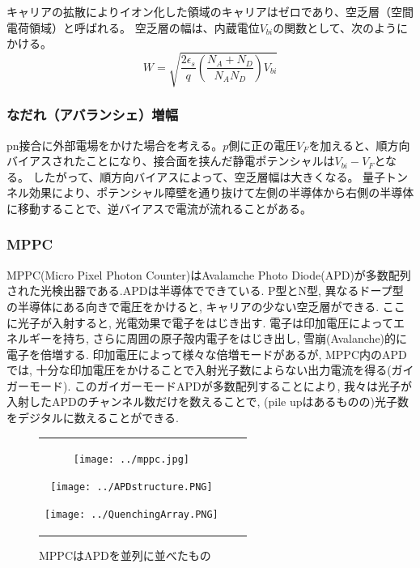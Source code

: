 キャリアの拡散によりイオン化した領域のキャリアはゼロであり、空乏層（空間電荷領域）と呼ばれる。
空乏層の幅は、内蔵電位$V_{bi}$の関数として、次のようにかける。
\begin{equation}
W=\sqrt{\frac{2\epsilon_s}{q}\left(\frac{N_A+N_D}{N_AN_D}\right)V_{bi}}
\end{equation}

\subsubsection{なだれ（アバランシェ）増幅}
pn接合に外部電場をかけた場合を考える。$p$側に正の電圧$V_F$を加えると、順方向バイアスされたことになり、接合面を挟んだ静電ポテンシャルは$V_{bi}-V_F$となる。
したがって、順方向バイアスによって、空乏層幅は大きくなる。
量子トンネル効果により、ポテンシャル障壁を通り抜けて左側の半導体から右側の半導体に移動することで、逆バイアスで電流が流れることがある。


\subsubsection{MPPC}
MPPC(Micro Pixel Photon Counter)はAvalamche Photo Diode(APD)が多数配列された光検出器である.APDは半導体でできている.
P型とN型, 異なるドープ型の半導体にある向きで電圧をかけると, キャリアの少ない空乏層ができる.
ここに光子が入射すると, 光電効果で電子をはじき出す.
電子は印加電圧によってエネルギーを持ち, さらに周囲の原子殻内電子をはじき出し, 雪崩(Avalanche)的に電子を倍増する.
印加電圧によって様々な倍増モードがあるが, MPPC内のAPDでは, 十分な印加電圧をかけることで入射光子数によらない出力電流を得る(ガイガーモード).
このガイガーモードAPDが多数配列することにより, 我々は光子が入射したAPDのチャンネル数だけを数えることで, (pile upはあるものの)光子数をデジタルに数えることができる.
\begin{figure}[h]
  \begin{tabular}{ccc}
    \begin{minipage}[t]{0.33\hsize}
      \begin{center}
        \texttt{[image: ../mppc.jpg]}
      \end{center}
      \caption{MPPC}
    \end{minipage}
    \begin{minipage}[t]{0.33\hsize}
      \begin{center}
        \texttt{[image: ../APDstructure.PNG]}
      \end{center}
      \caption{APD}
    \end{minipage}
    \begin{minipage}[t]{0.33\hsize}
      \begin{center}
        \texttt{[image: ../QuenchingArray.PNG]}
      \end{center}
      \caption{MPPCはAPDを並列に並べたもの}
    \end{minipage}
  \end{tabular}
\end{figure}

